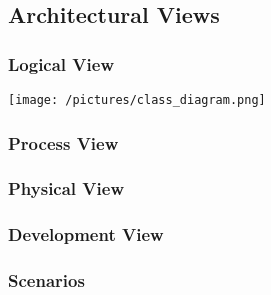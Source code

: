 \subsection{Architectural Views}

\subsubsection{Logical View} %
\texttt{[image: /pictures/class\_diagram.png]}

\subsubsection{Process View} %

\subsubsection{Physical View} %

\subsubsection{Development View} %

\subsubsection{Scenarios} %
